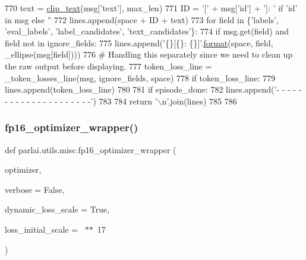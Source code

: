 \begin{DoxyCode}
770             text = \hyperlink{namespaceparlai_1_1utils_1_1misc_a219b248f4399036a381ca859aa97433e}{clip\_text}(msg[\textcolor{stringliteral}{'text'}], max\_len)
771             ID = \textcolor{stringliteral}{'['} + msg[\textcolor{stringliteral}{'id'}] + \textcolor{stringliteral}{']: '} \textcolor{keywordflow}{if} \textcolor{stringliteral}{'id'} \textcolor{keywordflow}{in} msg \textcolor{keywordflow}{else} \textcolor{stringliteral}{''}
772             lines.append(space + ID + text)
773         \textcolor{keywordflow}{for} field \textcolor{keywordflow}{in} \{\textcolor{stringliteral}{'labels'}, \textcolor{stringliteral}{'eval\_labels'}, \textcolor{stringliteral}{'label\_candidates'}, \textcolor{stringliteral}{'text\_candidates'}\}:
774             \textcolor{keywordflow}{if} msg.get(field) \textcolor{keywordflow}{and} field \textcolor{keywordflow}{not} \textcolor{keywordflow}{in} ignore\_fields:
775                 lines.append(\textcolor{stringliteral}{'\{\}[\{\}: \{\}]'}.\hyperlink{namespaceparlai_1_1chat__service_1_1services_1_1messenger_1_1shared__utils_a32e2e2022b824fbaf80c747160b52a76}{format}(space, field, \_ellipse(msg[field])))
776         \textcolor{comment}{# Handling this separately since we need to clean up the raw output before displaying.}
777         token\_loss\_line = \_token\_losses\_line(msg, ignore\_fields, space)
778         \textcolor{keywordflow}{if} token\_loss\_line:
779             lines.append(token\_loss\_line)
780 
781     \textcolor{keywordflow}{if} episode\_done:
782         lines.append(\textcolor{stringliteral}{'- - - - - - - - - - - - - - - - - - - - -'})
783 
784     \textcolor{keywordflow}{return} \textcolor{stringliteral}{'\(\backslash\)n'}.join(lines)
785 
786 
\end{DoxyCode}
\mbox{\label{namespaceparlai_1_1utils_1_1misc_a7836ac7469dc5744e0ad9e5e54da2396}} 
\subsubsection{\texorpdfstring{fp16\+\_\+optimizer\+\_\+wrapper()}{fp16\_optimizer\_wrapper()}}
{\footnotesize\ttfamily def parlai.\+utils.\+misc.\+fp16\+\_\+optimizer\+\_\+wrapper (\begin{DoxyParamCaption}\item[{}]{optimizer,  }\item[{}]{verbose = {\ttfamily False},  }\item[{}]{dynamic\+\_\+loss\+\_\+scale = {\ttfamily True},  }\item[{}]{loss\+\_\+initial\+\_\+scale = {~$\ast$$\ast$~17} }\end{DoxyParamCaption})}

